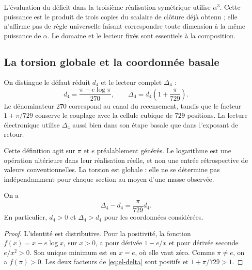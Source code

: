 L'évaluation du déficit dans la troisième réalisation symétrique utilise
\(\alpha^3\). Cette puissance est le produit de trois copies du scalaire
de clôture déjà obtenu ; elle n'affirme pas de règle universelle faisant
correspondre toute dimension à la même puissance de \(\alpha\).
Le domaine et le lecteur fixés sont essentiels à la composition.

\subsection{La torsion globale et la coordonnée basale}

\begin{definition}
On distingue le défaut réduit \(d_4\) et le lecteur complet
\(\Delta_4\) :
\begin{equation}
 d_4=\frac{\pi-e\log\pi}{270},\qquad
 \Delta_4=d_4\left(1+\frac{\pi}{729}\right).
 \label{eq:el-delta}
\end{equation}
Le dénominateur \(270\) correspond au canal du recensement, tandis que le facteur \(1+\pi/729\) conserve le couplage avec la cellule cubique de \(729\) positions. La lecture électronique utilise \(\Delta_4\) aussi bien dans son étape basale que dans l'exposant de retour.
\end{definition}

Cette définition agit sur \(\pi\) et \(e\) préalablement générés. Le
logarithme est une opération ultérieure dans leur réalisation réelle, et non une
entrée rétrospective de valeurs conventionnelles. La torsion est globale :
elle ne se détermine pas indépendamment pour chaque section au moyen d'une masse
observée.

\begin{lemma}
On a
\begin{equation}
 \Delta_4-d_4=\frac{\pi}{729}d_4.
 \label{eq:el-delta-diferencia}
\end{equation}
En particulier, \(d_4>0\) et \(\Delta_4>d_4\) pour les coordonnées
considérées.
\end{lemma}
\begin{proof}
L'identité est distributive. Pour la positivité, la fonction
\(f(x)=x-e\log x\), sur \(x>0\), a pour dérivée \(1-e/x\) et
pour dérivée seconde \(e/x^2>0\). Son unique minimum est en \(x=e\), où
elle vaut zéro. Comme \(\pi\ne e\), on a \(f(\pi)>0\). Les deux facteurs
de \eqref{eq:el-delta} sont positifs et \(1+\pi/729>1\).
\end{proof}


